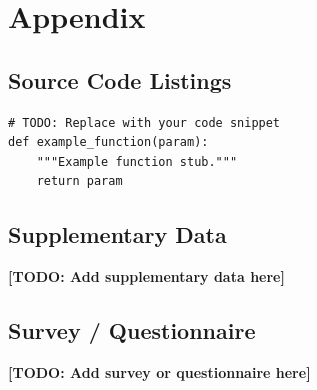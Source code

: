 \appendix

\section{Appendix}

\subsection{Source Code Listings}


\begin{verbatim}
# TODO: Replace with your code snippet
def example_function(param):
    """Example function stub."""
    return param
\end{verbatim}

\subsection{Supplementary Data}


\textbf{[TODO: Add supplementary data here]}

\subsection{Survey / Questionnaire}


\textbf{[TODO: Add survey or questionnaire here]}
